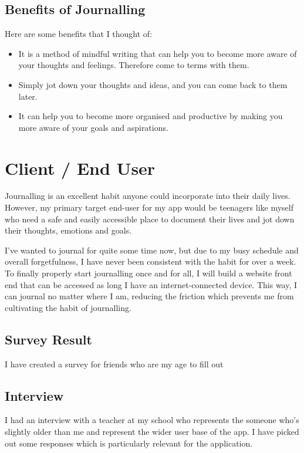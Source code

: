 \subsection{Benefits of Journalling}
Here are some benefits that I thought of:
\begin{itemize}
  \item It is a method of mindful writing that can help you to become more aware of your thoughts and feelings. Therefore come to terms with them.
  \item Simply jot down your thoughts and ideas, and you can come back to them later.
  \item It can help you to become more organised and productive by making you more aware of your goals and aspirations.
\end{itemize}

\bigskip

\section{Client / End User}

Journalling is an excellent habit anyone could incorporate into their daily lives. However, my primary target end-user for my app would be teenagers like myself who need a safe and easily accessible place to document their lives and jot down their thoughts, emotions and goals. 

I've wanted to journal for quite some time now, but due to my busy schedule and overall forgetfulness, I have never been consistent with the habit for over a week. To finally properly start journalling once and for all, I will build a website front end that can be accessed as long I have an internet-connected device. This way, I can journal no matter where I am, reducing the friction which prevents me from cultivating the habit of journalling.

\subsection{Survey Result}
I have created a survey for friends who are my age to fill out

\subsection*{Interview}
 I had an interview with a teacher at my school who represents the someone who's slightly older than me and represent the wider user base of the app. I have picked out some responses which is particularly relevant for the application.

